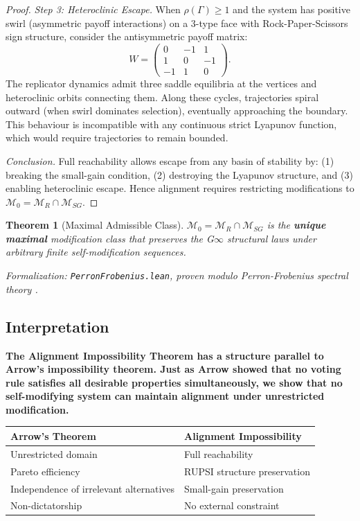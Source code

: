 \documentclass[12pt]{article}
\newtheorem{theorem}{Theorem}[section]
\newcommand{\added}[1]{\textbf{#1}}
\begin{document}
\begin{proof}
\textit{Step 3: Heteroclinic Escape.}
When $\rho(\Gamma) \geq 1$ and the system has positive swirl (asymmetric payoff interactions) on a 3-type face with Rock-Paper-Scissors sign structure, consider the antisymmetric payoff matrix:
\[
W = \begin{pmatrix} 0 & -1 & 1 \\ 1 & 0 & -1 \\ -1 & 1 & 0 \end{pmatrix}.
\]
The replicator dynamics admit three saddle equilibria at the vertices and heteroclinic orbits connecting them. Along these cycles, trajectories spiral outward (when swirl dominates selection), eventually approaching the boundary. This behaviour is incompatible with any continuous strict Lyapunov function, which would require trajectories to remain bounded.

\textit{Conclusion.}
Full reachability allows escape from any basin of stability by: (1) breaking the small-gain condition, (2) destroying the Lyapunov structure, and (3) enabling heteroclinic escape. Hence alignment requires restricting modifications to $\mathcal{M}_0 = \mathcal{M}_R \cap \mathcal{M}_{SG}$.
\end{proof}

\begin{theorem}[Maximal Admissible Class]
\label{thm:maximal-admissible}
$\mathcal{M}_0 = \mathcal{M}_R \cap \mathcal{M}_{SG}$ is the \textbf{unique maximal} modification class that preserves the G$\infty$ structural laws under arbitrary finite self-modification sequences.
\end{theorem}
\noindent\textit{Formalization: \texttt{PerronFrobenius.lean}, proven modulo Perron-Frobenius spectral theory \citep{horn2012matrix}.}

\subsection{Interpretation}

\added{\textbf{The Alignment Impossibility Theorem has a structure parallel to Arrow's impossibility theorem. Just as Arrow showed that no voting rule satisfies all desirable properties simultaneously, we show that no self-modifying system can maintain alignment under unrestricted modification.}}

\begin{center}
\begin{tabular}{ll}
\toprule
\textbf{Arrow's Theorem} & \textbf{Alignment Impossibility} \\
\midrule
Unrestricted domain & Full reachability \\
Pareto efficiency & RUPSI structure preservation \\
Independence of irrelevant alternatives & Small-gain preservation \\
Non-dictatorship & No external constraint \\
\bottomrule
\end{tabular}
\end{center}
\end{document}
